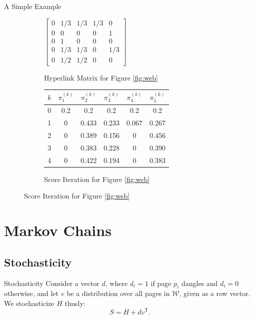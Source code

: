 \documentclass{beamer}
\newcommand{\iter}[2]{#1^{(#2)}}
\newcommand{\transpose}[1]{#1^{\mathsf{T}}}
\newcommand{\iter}[2]{#1^{(#2)}}
\begin{document}
\begin{frame}{A Simple Example}
    \begin{figure}[t!]
        \centering
        \begin{subfigure}
            \centering
            $\begin{bmatrix}
                0 & 1/3 & 1/3 & 1/3 & 0 \\
                0 & 0 & 0 & 0 & 1 \\
                0 & 1 & 0 & 0 & 0 \\
                0 & 1/3 & 1/3 & 0 & 1/3 \\
                0 & 1/2 & 1/2 & 0 & 0
            \end{bmatrix}$
            \caption{Hyperlink Matrix for Figure \ref{fig:web}}
        \end{subfigure}
        \vspace{1em}
        \begin{subfigure}
        \centering
        \begin{tabular}{|c||c|c|c|c|c|}
             \hline
             $k$ & $\iter{\pi_1}{k}$ & $\iter{\pi_2}{k}$ & $\iter{\pi_3}{k}$ & $\iter{\pi_4}{k}$ & $\iter{\pi_5}{k}$ \\
             \hline\hline
             0 & 0.2 & 0.2 & 0.2 & 0.2 & 0.2 \\
             1 & 0 & 0.433 & 0.233 & 0.067 & 0.267 \\
             2 & 0 & 0.389 & 0.156 & 0 & 0.456 \\
             3 & 0 & 0.383 & 0.228 & 0 & 0.390 \\
             4 & 0 & 0.422 & 0.194 & 0 & 0.383 \\
             \hline
        \end{tabular}
        \caption{Score Iteration for Figure \ref{fig:web}}
        \end{subfigure}
        
        \label{fig:iterative_example}
    \end{figure}
\end{frame}

\section{Markov Chains}
\subsection{Stochasticity}
\begin{frame}{Stochasticity}
    Consider a vector $d$, where $d_i=1$ if page $p_i$ dangles and $d_i=0$ otherwise, and let $v$ be a distribution over all pages in $\mathcal{W}$, given as a row vector. We stochasticize $H$ thusly:
	\begin{equation*}
	    \label{eqn:S}
		S=H + d \transpose{v}.
	\end{equation*}
\end{frame}
\end{document}
